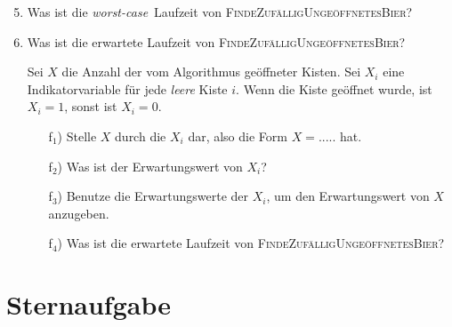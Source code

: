 \documentclass{uebung_cs}
\begin{document}
\begin{aufgabe}[Bierkisten]
	\begin{enumerate}
		\setcounter{enumi}{4}
		\item Was ist die \textit{worst-case}~Laufzeit von \textsc{FindeZufälligUngeöffnetesBier}?
		\item Was ist die erwartete Laufzeit von \textsc{FindeZufälligUngeöffnetesBier}?
		\item[] Sei $X$ die Anzahl der vom Algorithmus geöffneter Kisten. Sei $X_i$ eine Indikatorvariable für jede \emph{leere} Kiste $i$. Wenn die Kiste geöffnet wurde, ist $X_i = 1$, sonst ist $X_i = 0$. 
		\begin{itemize}[topsep=0.21cm, leftmargin=1.2cm]
			\item[f$_1$)] Stelle $X$ durch die $X_i$ dar, also die Form $X = .....$ hat.
			\item[f$_2$)] Was ist der Erwartungswert von $X_i$?
			\item[f$_3$)] Benutze die Erwartungswerte der $X_i$, um den Erwartungswert von $X$ anzugeben.
			\item[f$_4$)] Was ist die erwartete Laufzeit von \textsc{FindeZufälligUngeöffnetesBier}?
		\end{itemize}
	\end{enumerate}
\end{aufgabe}

\section*{Sternaufgabe}

\begin{aufgabe}
	
\end{aufgabe}
\end{document}
